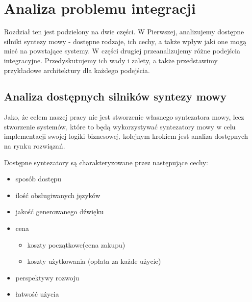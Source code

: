 \usepackage[polish]{babel}
\usepackage{polski}

\chapter{Analiza problemu integracji} %



\ifpdf
    \graphicspath{{4/figures/PNG/}{4/figures/PDF/}{4/figures/}}
\else
    \graphicspath{{4/figures/EPS/}{4/figures/}}
\fi



Rozdział ten jest podzielony na dwie części. W Pierwszej, analizujemy dostępne silniki syntezy mowy - dostępne rodzaje, ich cechy, a także wpływ jaki one mogą mieć na powstające systemy. W części drugiej przeanalizujemy różne podejścia integracyjne. Przedyskutujemy ich wady i zalety, a także przedstawimy przykładowe architektury dla każdego podejścia. 

\section {Analiza dostępnych silników syntezy mowy}

Jako, że celem naszej pracy nie jest stworzenie własnego syntezatora mowy, lecz stworzenie systemów, które to będą wykorzystywać syntezatory mowy w celu implementacji swojej logiki biznesowej, kolejnym krokiem jest analiza dostępnych na rynku rozwiązań. 

Dostępne syntezatory są charakteryzowane przez następujące cechy:
\begin{itemize}
	\item sposób dostępu
	\item ilość obsługiwanych języków
	\item jakość generowanego dźwięku
	\item cena
	\begin{itemize}
		\item koszty początkowe(cena zakupu)
		\item koszty użytkowania (opłata za każde użycie)
	\end{itemize}
	\item perspektywy rozwoju
	\item łatwość użycia
\end{itemize}

